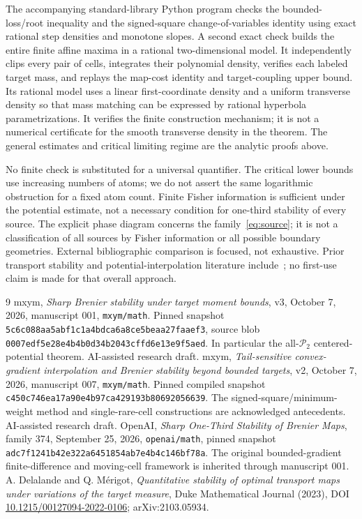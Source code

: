 \documentclass[11pt]{article}
\theoremstyle{remark}\newtheorem{remark}[theorem]{Remark}
\begin{document}
The accompanying standard-library Python program checks the bounded-loss/root inequality and the signed-square change-of-variables identity using exact rational step densities and monotone slopes. A second exact check builds the entire finite affine maxima in a rational two-dimensional model. It independently clips every pair of cells, integrates their polynomial density, verifies each labeled target mass, and replays the map-cost identity and target-coupling upper bound. Its rational model uses a linear first-coordinate density and a uniform transverse density so that mass matching can be expressed by rational hyperbola parametrizations. It verifies the finite construction mechanism; it is not a numerical certificate for the smooth transverse density in the theorem. The general estimates and critical limiting regime are the analytic proofs above.

No finite check is substituted for a universal quantifier. The critical lower bounds use increasing numbers of atoms; we do not assert the same logarithmic obstruction for a fixed atom count. Finite Fisher information is sufficient under the potential estimate, not a necessary condition for one-third stability of every source. The explicit phase diagram concerns the family~\eqref{eq:source}; it is not a classification of all sources by Fisher information or all possible boundary geometries. External bibliographic comparison is focused, not exhaustive. Prior transport stability and potential-interpolation literature include~\cite{DM}; no first-use claim is made for that overall approach.

\begin{thebibliography}{9}
 mxym, \emph{Sharp Brenier stability under target moment bounds}, v3, October 7, 2026, manuscript 001, \texttt{mxym/math}. Pinned snapshot \texttt{5c6c088aa5abf1c1a4bdca6a8ce5beaa27faaef3}, source blob \texttt{0007edf5e28e4b4b0d34b2043cffd6e13e9f5aed}. In particular the all-$\mathcal P_2$ centered-potential theorem. AI-assisted research draft.
 mxym, \emph{Tail-sensitive convex-gradient interpolation and Brenier stability beyond bounded targets}, v2, October 7, 2026, manuscript 007, \texttt{mxym/math}. Pinned compiled snapshot \texttt{c450c746ea17a90e4b97ca429193b80692056639}. The signed-square/minimum-weight method and single-rare-cell constructions are acknowledged antecedents. AI-assisted research draft.
 OpenAI, \emph{Sharp One-Third Stability of Brenier Maps}, family 374, September 25, 2026, \texttt{openai/math}, pinned snapshot \texttt{adc7f1241b42e322a6451854ab7e4b4c146bf78a}. The original bounded-gradient finite-difference and moving-cell framework is inherited through manuscript 001.
 A. Delalande and Q. M\'erigot, \emph{Quantitative stability of optimal transport maps under variations of the target measure}, Duke Mathematical Journal (2023), DOI \href{https://doi.org/10.1215/00127094-2022-0106}{10.1215/00127094-2022-0106}; arXiv:2103.05934.
\end{thebibliography}
\end{document}
